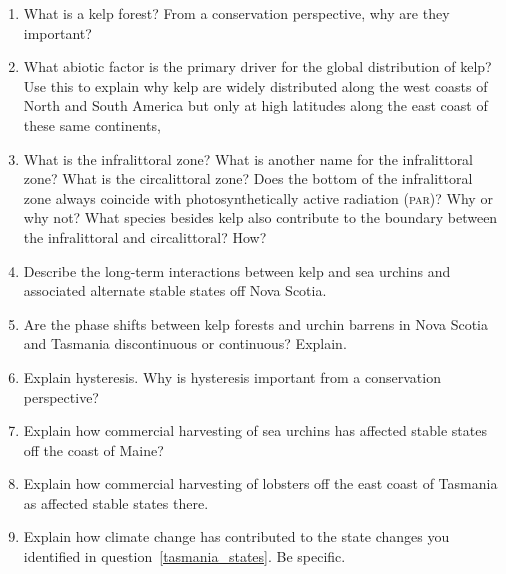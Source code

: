 \documentclass[letterpaper]{tufte-handout}
\begin{document}
\begin{enumerate}

	\item What is a kelp forest? From a conservation perspective, why are they important?

	\item What abiotic factor is the primary driver for the global distribution of kelp? Use this to explain why kelp are widely distributed along the west coasts of North and South America but only at high latitudes along the east coast of these same continents,

\item
  What is the infralittoral zone? What is another name for the infralittoral zone? What is the circalittoral zone? Does
  the bottom of the infralittoral zone always coincide with photosynthetically active radiation (\textsc{par})?
  Why or why not? What species besides kelp also contribute to the boundary between the infralittoral and circalittoral? How?

\item
  Describe the long-term interactions between kelp and sea urchins and 
  associated alternate stable states off Nova Scotia.

\item
  Are the phase shifts between kelp forests and urchin barrens in Nova Scotia and Tasmania discontinuous or continuous? Explain. 
  
\item Explain hysteresis. Why is hysteresis important from a conservation perspective?

\item Explain how commercial harvesting of sea urchins has affected stable states off the coast of Maine?

\item\label{tasmania_states} Explain how commercial harvesting of lobsters off the east coast of Tasmania as affected stable states there.

\item Explain how climate change has contributed to the state changes you identified in question~\ref{tasmania_states}. Be specific.


\end{enumerate}
\end{document}
